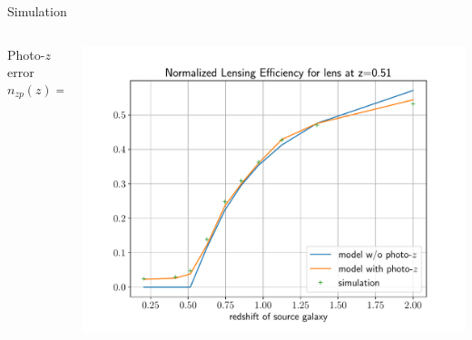\documentclass[10pt]{beamer}
\begin{document}
\begin{frame}{Simulation}
\begin{columns}
\begin{column}{0.4\textwidth}
\begin{alertblock}{Photo-$z$ error}
$$n_{zp}(z)=\left\langle P(z|z_p) \right\rangle$$
\end{alertblock}
\end{column}
\begin{column}{0.6\textwidth}
\includegraphics[height=.8\textwidth]{../paper_ms_method_HSCY1/lensing_efficiency.pdf}
\end{column}
\end{columns}
\end{frame}
\end{document}
